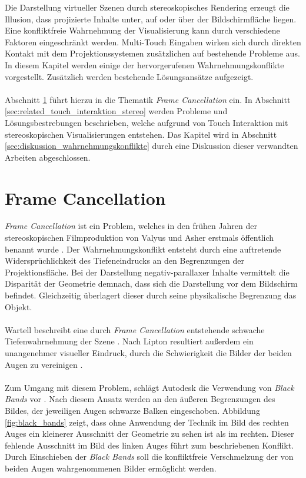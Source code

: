 Die Darstellung virtueller Szenen durch stereoskopisches Rendering erzeugt die Illusion, dass projizierte Inhalte unter, auf oder über der Bildschirmfläche liegen. Eine konfliktfreie Wahrnehmung der Visualisierung kann durch verschiedene Faktoren eingeschränkt werden. Multi-Touch Eingaben wirken sich durch direkten Kontakt mit dem Projektionssystemen zusätzlichen auf bestehende Probleme aus. In diesem Kapitel werden einige der hervorgerufenen Wahrnehmungskonflikte vorgestellt. Zusätzlich werden bestehende Lösungsansätze aufgezeigt.
\\\\
Abschnitt \ref{sec:related_frame_cancellation} führt hierzu in die Thematik \emph{Frame Cancellation} ein. In Abschnitt \ref{sec:related_touch_interaktion_stereo} werden Probleme und Lösungsbestrebungen beschrieben, welche aufgrund von Touch Interaktion mit stereoskopischen Visualisierungen entstehen. Das Kapitel wird in Abschnitt \ref{sec:diskussion_wahrnehmungskonflikte} durch eine Diskussion dieser verwandten Arbeiten abgeschlossen.


\section{Frame Cancellation}
\label{sec:related_frame_cancellation}

\emph{Frame Cancellation} ist ein Problem, welches in den frühen Jahren der stereoskopischen Filmproduktion von Valyus und Asher erstmals öffentlich benannt wurde \cite{valyus:1966}. Der Wahrnehmungskonflikt entsteht durch eine auftretende Widersprüchlichkeit des Tiefeneindrucks an den Begrenzungen der Projektionsfläche. Bei der Darstellung negativ-parallaxer Inhalte vermittelt die Disparität der Geometrie demnach, dass sich die Darstellung vor dem Bildschirm befindet. Gleichzeitig überlagert dieser durch seine physikalische Begrenzung das Objekt. 
\\\\
Wartell beschreibt eine durch \emph{Frame Cancellation} entstehende schwache Tiefenwahrnehmung der Szene \cite{wartell:2001}. Nach Lipton resultiert außerdem ein unangenehmer visueller Eindruck, durch die Schwierigkeit die Bilder der beiden Augen zu vereinigen \cite{lipton:2007}. 
\\\\
Zum Umgang mit diesem Problem, schlägt Autodesk die Verwendung von \emph{Black Bands} vor \cite{autodesk:2008}. Nach diesem Ansatz werden an den äußeren Begrenzungen des Bildes, der jeweiligen Augen schwarze Balken eingeschoben. Abbildung \ref{fig:black_bands} zeigt, dass ohne Anwendung der Technik im Bild des rechten Auges ein kleinerer Ausschnitt der Geometrie zu sehen ist als im rechten. Dieser fehlende Ausschnitt im Bild des linken Auges führt zum beschriebenen Konflikt. Durch Einschieben der \emph{Black Bands} soll die konfliktfreie Verschmelzung der von beiden Augen wahrgenommenen Bilder ermöglicht werden. 

